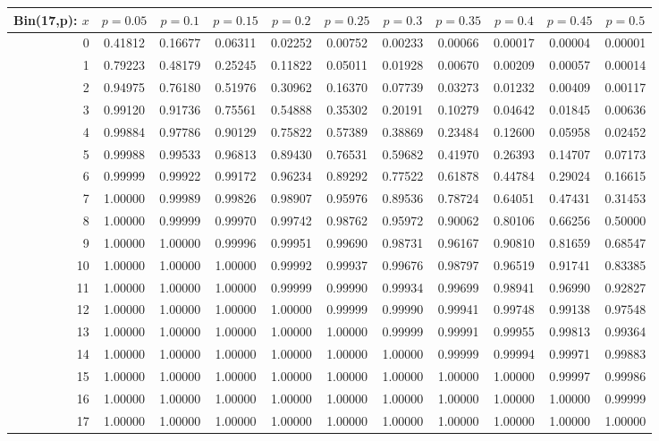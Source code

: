 \vspace{8pt minus 6pt}
\begin{tabular}{@{\extracolsep{-2pt}}|r|c|c|c|c|c|c|c|c|c|c|}
\hline
Bin(17,p): $x$
   & $p\!=\!0.05$& $p\!=\!0.1$& $p\!=\!0.15$& $p\!=\!0.2$& $p\!=\!0.25$& $p\!=\!0.3$& $p\!=\!0.35$& $p\!=\!0.4$& $p\!=\!0.45$& $p\!=\!0.5$\\\hline
  0&0.41812&0.16677&0.06311&0.02252&0.00752&0.00233&0.00066&0.00017&0.00004&0.00001\\
  1&0.79223&0.48179&0.25245&0.11822&0.05011&0.01928&0.00670&0.00209&0.00057&0.00014\\
  2&0.94975&0.76180&0.51976&0.30962&0.16370&0.07739&0.03273&0.01232&0.00409&0.00117\\
  3&0.99120&0.91736&0.75561&0.54888&0.35302&0.20191&0.10279&0.04642&0.01845&0.00636\\
  4&0.99884&0.97786&0.90129&0.75822&0.57389&0.38869&0.23484&0.12600&0.05958&0.02452\\
  5&0.99988&0.99533&0.96813&0.89430&0.76531&0.59682&0.41970&0.26393&0.14707&0.07173\\
  6&0.99999&0.99922&0.99172&0.96234&0.89292&0.77522&0.61878&0.44784&0.29024&0.16615\\
  7&1.00000&0.99989&0.99826&0.98907&0.95976&0.89536&0.78724&0.64051&0.47431&0.31453\\
  8&1.00000&0.99999&0.99970&0.99742&0.98762&0.95972&0.90062&0.80106&0.66256&0.50000\\
  9&1.00000&1.00000&0.99996&0.99951&0.99690&0.98731&0.96167&0.90810&0.81659&0.68547\\
 10&1.00000&1.00000&1.00000&0.99992&0.99937&0.99676&0.98797&0.96519&0.91741&0.83385\\
 11&1.00000&1.00000&1.00000&0.99999&0.99990&0.99934&0.99699&0.98941&0.96990&0.92827\\
 12&1.00000&1.00000&1.00000&1.00000&0.99999&0.99990&0.99941&0.99748&0.99138&0.97548\\
 13&1.00000&1.00000&1.00000&1.00000&1.00000&0.99999&0.99991&0.99955&0.99813&0.99364\\
 14&1.00000&1.00000&1.00000&1.00000&1.00000&1.00000&0.99999&0.99994&0.99971&0.99883\\
 15&1.00000&1.00000&1.00000&1.00000&1.00000&1.00000&1.00000&1.00000&0.99997&0.99986\\
 16&1.00000&1.00000&1.00000&1.00000&1.00000&1.00000&1.00000&1.00000&1.00000&0.99999\\
 17&1.00000&1.00000&1.00000&1.00000&1.00000&1.00000&1.00000&1.00000&1.00000&1.00000\\
\hline
\end{tabular}

